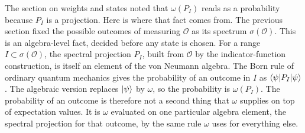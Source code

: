 \begin{physconnect}
The section on weights and states noted that $\omega(P_I)$ reads as a probability because $P_I$ is a
projection. Here is where that fact comes from. The previous section fixed the possible outcomes of measuring
$\mathcal O$ as its spectrum $\sigma(\mathcal O)$. This is an algebra-level fact, decided before any state is
chosen. For a range $I\subset\sigma(\mathcal O)$, the spectral projection $P_I$, built from $\mathcal O$ by
the indicator-function construction, is itself an element of the von Neumann algebra. The Born rule of
ordinary quantum mechanics gives the probability of an outcome in $I$ as $\braket{\psi|P_I|\psi}$. The
algebraic version replaces $\ket\psi$ by $\omega$, so the probability is $\omega(P_I)$. The probability of an
outcome is therefore not a second thing that $\omega$ supplies on top of expectation values. It is $\omega$
evaluated on one particular algebra element, the spectral projection for that outcome, by the same rule
$\omega$ uses for everything else.
\end{physconnect}

